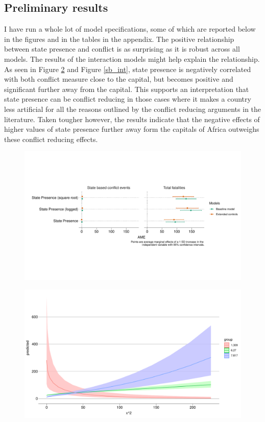 \documentclass[12pt]{article}
\begin{document}
\begin{multicols}{2}
\section{Preliminary results}

I have run a whole lot of model specifications, some of which are reported below
in the figures and in the tables in the appendix. The positive relationship
between state presence and conflict is as surprising as it is robust across all
models. The results of the interaction models might help explain the
relationship. As seen in Figure \ref{deaths_int} and Figure \ref{sb_int}, state
presence is negatively correlated with both conflict measure close to the
capital, but becomes positive and significant further away from the capital.
This supports an interpretation that state presence can be conflict reducing in
those cases where it makes a country less artificial for all the reasons
outlined by the conflict reducing arguments in the literature. Taken tougher
however, the results indicate that the negative effects of higher values of
state presence further away form the capitals of Africa outweighs these conflict
reducing effects. 

\end{multicols}

\begin{figure}[htpb]
	\centering
	\includegraphics[width=\linewidth]{"../R/Output/conflictMargins.pdf"}
	\caption{}
	\label{margins}
\end{figure}

\begin{figure}[htpb]
	\centering
	\includegraphics[width=\linewidth]{"../R/Output/deathsIntPlot.pdf"}
	\caption{}
	\label{deaths_int}
\end{figure}
\end{document}
